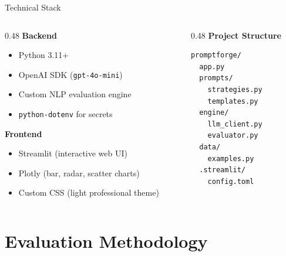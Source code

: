 \documentclass[aspectratio=169, 12pt]{beamer}
\begin{document}
\begin{frame}[fragile]{Technical Stack}
  \begin{columns}[T]
    \begin{column}{0.48\textwidth}
      \textbf{Backend}
      \begin{itemize}
        \item Python 3.11+
        \item OpenAI SDK (\texttt{gpt-4o-mini})
        \item Custom NLP evaluation engine
        \item \texttt{python-dotenv} for secrets
      \end{itemize}
      \vspace{0.8em}
      \textbf{Frontend}
      \begin{itemize}
        \item Streamlit (interactive web UI)
        \item Plotly (bar, radar, scatter charts)
        \item Custom CSS (light professional theme)
      \end{itemize}
    \end{column}
    \begin{column}{0.48\textwidth}
      \textbf{Project Structure}
\begin{lstlisting}
promptforge/
  app.py
  prompts/
    strategies.py
    templates.py
  engine/
    llm_client.py
    evaluator.py
  data/
    examples.py
  .streamlit/
    config.toml
\end{lstlisting}
    \end{column}
  \end{columns}
\end{frame}

\section{Evaluation Methodology}
\end{document}
